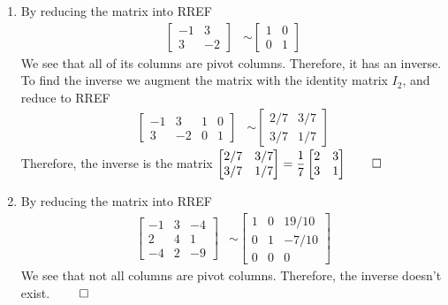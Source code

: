 \documentclass[12pt, a4paper]{article}
\begin{document}
\begin{enumerate}[Q\arabic*.]
\begin{enumerate}[(\alph*)]
      \item By reducing the matrix into RREF
        \begin{align*}
          \begin{bmatrix}
            -1 & 3 \\ 3 & -2
          \end{bmatrix} &\sim 
          \begin{bmatrix}
            1 & 0 \\ 0 & 1
          \end{bmatrix}
        \end{align*}
        We see that all of its columns are pivot columns. Therefore, it has an inverse.
        To find the inverse we augment the matrix with the identity matrix $I_2$, and reduce to RREF
        \begin{align*}
          \begin{bmatrix}
            -1 & 3 & 1 & 0 \\ 3 & -2 & 0 & 1
          \end{bmatrix} &\sim
          \begin{bmatrix}
            2/7 & 3/7 \\ 3/7 & 1/7
          \end{bmatrix}
        \end{align*}
        Therefore, the inverse is the matrix $\begin{bmatrix}
            2/7 & 3/7 \\ 3/7 & 1/7
            \end{bmatrix} = \displaystyle \frac{1}{7}\begin{bmatrix}2&3\\3&1\end{bmatrix}\qed$
          
      \item By reducing the matrix into RREF
        \begin{align*}
          \begin{bmatrix}
            -1 & 3 & -4 \\ 2 & 4 & 1 \\ -4 & 2 & -9
          \end{bmatrix} &\sim 
          \begin{bmatrix}
            1 & 0 & 19/10 \\ 0 & 1 & -7/10 \\ 0 & 0 & 0
          \end{bmatrix}
        \end{align*}
        We see that not all columns are pivot columns. Therefore, the inverse doesn't exist. $\qed$
    \end{enumerate}


\end{enumerate}
\end{document}
